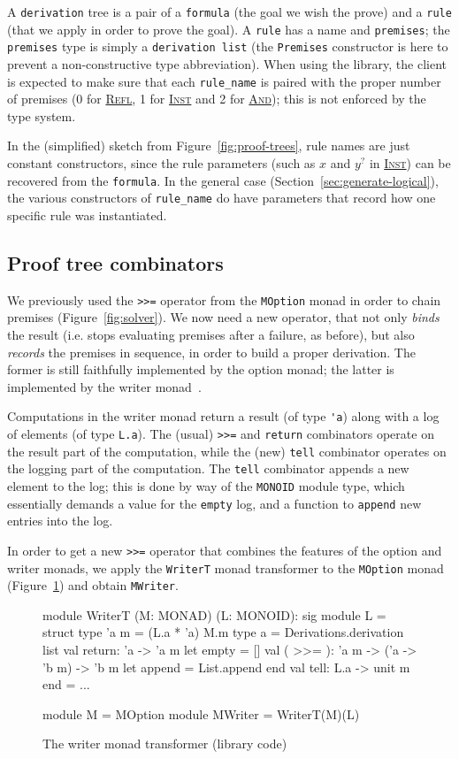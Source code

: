 \documentclass{easychair}
\def\li{\lstinline}
\let\TirName\textsc
\renewcommand{\DefTirName}[1]{\hyperlink{#1}{\TirName {#1}}}
\let\Rule\DefTirName
\newcommand{\fref}[1]{Figure~\ref{fig:#1}}
\newcommand{\sref}[1]{Section~\ref{sec:#1}}
\newcommand{\f}[1]{\ensuremath{#1^?}} %
\begin{document}
A \li+derivation+ tree is a pair of a \li+formula+ (the goal we wish the prove)
and a \li+rule+ (that we apply in order to prove the goal). A \li+rule+ has a name
and \li+premises+; the \li+premises+ type is simply a \li+derivation list+ (the
\li+Premises+ constructor is here to prevent a non-constructive type
abbreviation). When using the library, the client is expected to make sure
that each \li+rule_name+ is paired with the proper
number of premises (0 for \Rule{Refl}, 1 for
\Rule{Inst} and 2 for \Rule{And}); this is not enforced by the type system.

In the (simplified) sketch from \fref{proof-trees}, rule names are just constant
constructors, since the rule parameters (such as $x$ and $\f y$ in \Rule{Inst})
can be recovered from the \li+formula+. In the general case
(\sref{generate-logical}), the various constructors of \li+rule_name+ do have
parameters that record how one specific rule was instantiated.

\subsection{Proof tree combinators}

We previously used the \li+>>=+ operator from the \li+MOption+ monad in order to
chain premises (\fref{solver}). We now need a new operator, that not only
\emph{binds} the result (i.e. stops evaluating premises after a failure, as
before), but also \emph{records} the premises in sequence, in order to build a
proper derivation. The former is still faithfully implemented by the option
monad; the latter is implemented by the writer monad~\cite{jones-95-}.

Computations in the writer monad return a result (of type \li+'a+) along with a log of
elements (of type \li+L.a+). The (usual) \li+>>=+ and \li+return+ combinators operate on
the result part of the computation, while the (new) \li+tell+ combinator
operates on the logging part of the computation. The \li+tell+ combinator
appends a new element to the log; this is done by way of the \li+MONOID+ module
type, which essentially demands a value for the \li+empty+ log, and a function
to \li+append+ new entries into the log.

In order to get a new \li+>>=+ operator that combines the features of
the option and writer monads, we apply the \li+WriterT+ monad transformer to the
\li+MOption+ monad (\fref{writer}) and obtain \li+MWriter+.

\begin{figure}
  \centering
\begin{ocaml}
module WriterT (M: MONAD) (L: MONOID): sig      module L = struct
  type 'a m = (L.a * 'a) M.m                      type a = Derivations.derivation list
  val return: 'a -> 'a m                          let empty = []
  val ( >>= ): 'a m -> ('a -> 'b m) -> 'b m       let append = List.append
                                                end
  val tell: L.a -> unit m
end = ...

module M = MOption
module MWriter = WriterT(M)(L)
\end{ocaml}
  \caption{The writer monad transformer (library code)}
  \label{fig:writer}
\end{figure}
\end{document}
